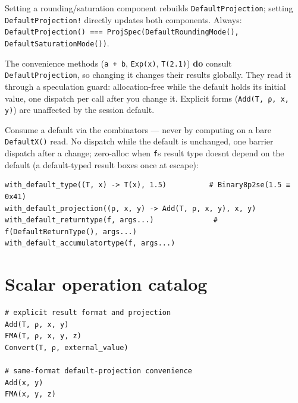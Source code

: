 Setting a rounding/saturation component rebuilds \texttt{DefaultProjection}; setting \texttt{DefaultProjection!} directly updates both components. Always: \texttt{DefaultProjection() === ProjSpec(DefaultRoundingMode(), DefaultSaturationMode())}.



The convenience methods (\texttt{a + b}, \texttt{Exp(x)}, \texttt{T(2.1)}) \textbf{do} consult \texttt{DefaultProjection}, so changing it changes their results globally. They read it through a speculation guard: allocation-free while the default holds its initial value, one dispatch per call after you change it. Explicit forms (\texttt{Add(T, ρ, x, y)}) are unaffected by the session default.



Consume a default via the combinators — never by computing on a bare \texttt{DefaultX()} read. No dispatch while the default is unchanged, one barrier dispatch after a change; zero-alloc when \texttt{f}{\textquotesingle}s result type doesn{\textquotesingle}t depend on the default (a default-typed result boxes once at escape):




\begin{verbatim}
with_default_type((T, x) -> T(x), 1.5)          # Binary8p2se(1.5 ≡ 0x41)
with_default_projection((ρ, x, y) -> Add(T, ρ, x, y), x, y)
with_default_returntype(f, args...)              # f(DefaultReturnType(), args...)
with_default_accumulatortype(f, args...)
\end{verbatim}



\section{Scalar operation catalog}



\label{9067118353150552449}{}



\begin{verbatim}
# explicit result format and projection
Add(T, ρ, x, y)
FMA(T, ρ, x, y, z)
Convert(T, ρ, external_value)

# same-format default-projection convenience
Add(x, y)
FMA(x, y, z)
\end{verbatim}




